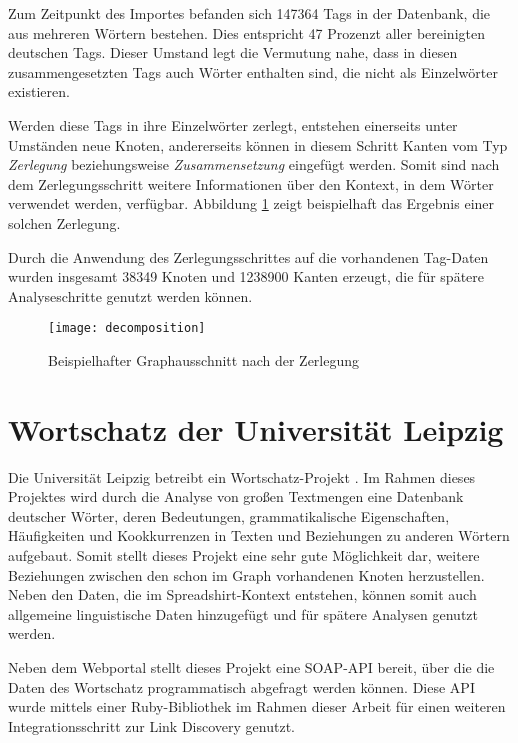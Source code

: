 Zum Zeitpunkt des Importes befanden sich \num{147364} Tags in der Datenbank, die aus mehreren Wörtern bestehen. Dies entspricht \num{47} Prozenzt aller bereinigten deutschen Tags. Dieser Umstand legt die Vermutung nahe, dass in diesen zusammengesetzten Tags auch Wörter enthalten sind, die nicht als Einzelwörter existieren.

Werden diese Tags in ihre Einzelwörter zerlegt, entstehen einerseits unter Umständen neue Knoten, andererseits können in diesem Schritt Kanten vom Typ \emph{Zerlegung} beziehungsweise \emph{Zusammensetzung} eingefügt werden. Somit sind nach dem Zerlegungsschritt weitere Informationen über den Kontext, in dem Wörter verwendet werden, verfügbar. Abbildung \ref{fig:decomposition} zeigt beispielhaft das Ergebnis einer solchen Zerlegung.

Durch die Anwendung des Zerlegungsschrittes auf die vorhandenen Tag-Daten wurden insgesamt \num{38349} Knoten und \num{1238900} Kanten erzeugt, die für spätere Analyseschritte genutzt werden können.

\begin{figure}
\centering
\texttt{[image: decomposition]}
\caption{Beispielhafter Graphausschnitt nach der Zerlegung}
\label{fig:decomposition}
\end{figure}

\section{Wortschatz der Universität Leipzig}

Die Universität Leipzig betreibt ein Wortschatz-Projekt \cite{ws2013}. Im Rahmen dieses Projektes wird durch die Analyse von großen Textmengen eine Datenbank deutscher Wörter, deren Bedeutungen, grammatikalische Eigenschaften, Häufigkeiten und Kookkurrenzen in Texten und Beziehungen zu anderen Wörtern aufgebaut. Somit stellt dieses Projekt eine sehr gute Möglichkeit dar, weitere Beziehungen zwischen den schon im Graph vorhandenen Knoten herzustellen. Neben den Daten, die im Spreadshirt-Kontext entstehen, können somit auch allgemeine linguistische Daten hinzugefügt und für spätere Analysen genutzt werden.

Neben dem Webportal stellt dieses Projekt eine SOAP-API bereit, über die die Daten des Wortschatz programmatisch abgefragt werden können. Diese API wurde mittels einer Ruby-Bibliothek \cite{wlapi2013} im Rahmen dieser Arbeit für einen weiteren Integrationsschritt zur Link Discovery genutzt.

